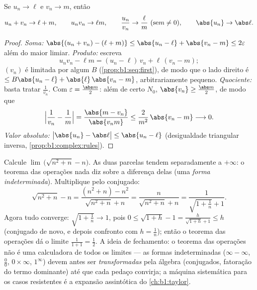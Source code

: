 \begin{theorem}\label{thm:b1:seq:operations}
Se $u_n \to \ell$ e $v_n \to m$, então
\[
u_n + v_n \to \ell + m, \qquad u_n v_n \to \ell m, \qquad
\frac{u_n}{v_n} \to \frac{\ell}{m} \ (\text{se} m \neq 0),
\qquad \abs{u_n} \to \abs\ell .
\]
\end{theorem}

\begin{proof}
\emph{Soma:} $\abs{(u_n + v_n) - (\ell + m)} \leq \abs{u_n - \ell} +
\abs{v_n - m} \leq 2\varepsilon$ além do maior limiar.
\emph{Produto:} escreva
\[
u_n v_n - \ell m = (u_n - \ell)\,v_n + \ell\,(v_n - m);
\]
$(v_n)$ é limitada por algum $B$ (\cref{prop:b1:seq:first}), de modo que o
lado direito é $\leq B\abs{u_n - \ell} + \abs{\ell}\,\abs{v_n - m}$,
arbitrariamente pequeno. \emph{Quociente:} basta tratar $\frac
1{v_n}$. Com $\varepsilon = \frac{\abs m}{2}$: além de certo $N_0$,
$\abs{v_n} \geq \frac{\abs m}{2}$, de modo que
\[
\Bigl| \frac{1}{v_n} - \frac 1m \Bigr|
= \frac{\abs{m - v_n}}{\abs{v_n m}}
\leq \frac{2}{m^2}\,\abs{v_n - m} \longrightarrow 0 .
\]
\emph{Valor absoluto:} $\bigl|\abs{u_n} - \abs\ell\bigr| \leq
\abs{u_n - \ell}$ (desigualdade triangular inversa,
\cref{prop:b1:complex:rules}).
\end{proof}

\begin{example}\label{ex:b1:seq:conjugatetrick}
Calcule $\lim\,\bigl(\sqrt{n^2 + n} - n\bigr)$. As duas parcelas
tendem separadamente a $+\infty$: o teorema das operações nada diz
sobre a diferença delas (uma \emph{forma indeterminada}). Multiplique
pelo conjugado:
\[
\sqrt{n^2 + n} - n
= \frac{(n^2 + n) - n^2}{\sqrt{n^2 + n} + n}
= \frac{n}{\sqrt{n^2+n} + n}
= \frac{1}{\sqrt{1 + \frac1n} + 1} .
\]
Agora tudo converge: $\sqrt{1 + \frac1n} \to 1$, pois
$0 \leq \sqrt{1 + h} - 1 = \frac{h}{\sqrt{1+h} + 1} \leq h$
(conjugado de novo, e depois confronto com $h = \frac1n$); então o
teorema das operações dá o limite $\frac{1}{1 + 1} =
\frac12$. A ideia de fechamento: o teorema das operações não é uma
calculadora de todos os limites --- as formas indeterminadas ($\infty -
\infty$, $\frac00$, $0 \times \infty$, $1^\infty$) devem antes ser
\emph{transformadas} pela álgebra (conjugados, fatoração do termo
dominante) até que cada pedaço convirja; a máquina sistemática para os
casos resistentes é a expansão assintótica do
\cref{ch:b1:taylor}.
\end{example}

